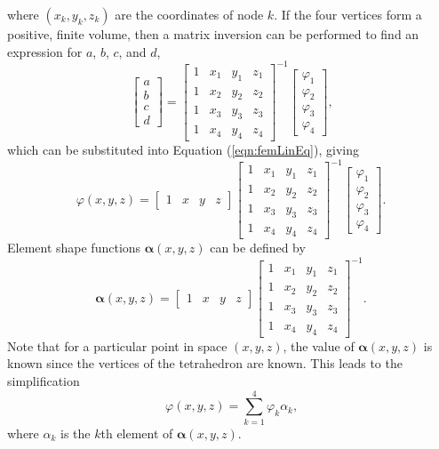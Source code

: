 where \(\left(x_k,y_k,z_k\right)\) are the coordinates of node \(k\). If the four vertices form a positive, finite volume, then a matrix inversion can be performed to find an expression for \(a\), \(b\), \(c\), and \(d\),
\begin{equation}
    \begin{bmatrix} a \\ b \\ c \\ d \end{bmatrix} = \begin{bmatrix} 1 & x_1 & y_1 & z_1 \\ 1 & x_2 & y_2 & z_2 \\ 1 & x_3 & y_3 & z_3 \\ 1 & x_4 & y_4 & z_4 \end{bmatrix}^{-1} \begin{bmatrix} \varphi_1 \\ \varphi_2 \\ \varphi_3 \\ \varphi_4 \end{bmatrix} \text{,}
\end{equation}
which can be substituted into Equation (\ref{eqn:femLinEq}), giving
\begin{equation}\label{eqn:scaryEqnForPhi}
    \varphi\left(x,y,z\right) = \begin{bmatrix} 1 & x & y & z \end{bmatrix} \begin{bmatrix} 1 & x_1 & y_1 & z_1 \\ 1 & x_2 & y_2 & z_2 \\ 1 & x_3 & y_3 & z_3 \\ 1 & x_4 & y_4 & z_4 \end{bmatrix}^{-1} \begin{bmatrix} \varphi_1 \\ \varphi_2 \\ \varphi_3 \\ \varphi_4 \end{bmatrix} \text{.}
\end{equation}
Element shape functions \(\bm{\alpha}\left(x,y,z\right)\) can be defined by
\begin{equation}
    \bm{\alpha}\left(x,y,z\right) = \begin{bmatrix} 1 & x & y & z \end{bmatrix} \begin{bmatrix} 1 & x_1 & y_1 & z_1 \\ 1 & x_2 & y_2 & z_2 \\ 1 & x_3 & y_3 & z_3 \\ 1 & x_4 & y_4 & z_4 \end{bmatrix}^{-1} \text{.}
\end{equation}
Note that for a particular point in space \(\left(x,y,z\right)\), the value of \(\bm{\alpha}\left(x,y,z\right)\) is known since the vertices of the tetrahedron are known. This leads to the simplification
\begin{equation}\label{eqn:femDiscretisedPhi}
    \varphi\left(x,y,z\right) = \sum_{k = 1}^4 \varphi_k \alpha_k \text{,}
\end{equation}
where \(\alpha_k\) is the \(k\)th element of \(\bm{\alpha}\left(x,y,z\right)\).

